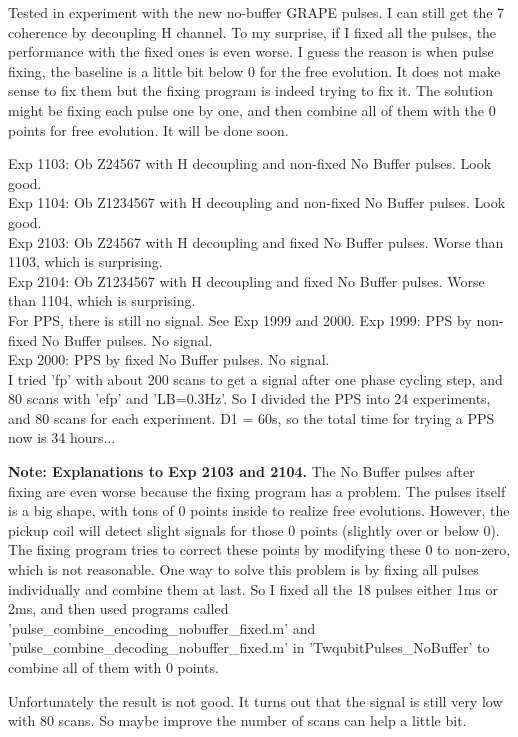 Tested in experiment with the new no-buffer GRAPE pulses. I can still get the 7 coherence by decoupling H channel. To my surprise, if I fixed all the pulses, the performance with the fixed ones is even worse. I guess the reason is when pulse fixing, the baseline is a little bit below 0 for the free evolution. It does not make sense to fix them but the fixing program is indeed trying to fix it. The solution might be fixing each pulse one by one, and then combine all of them with the 0 points for free evolution. It will be done soon.

Exp 1103: Ob Z24567 with H decoupling and non-fixed No Buffer pulses. Look good. \\
Exp 1104: Ob Z1234567 with H decoupling and non-fixed No Buffer pulses. Look good. \\
Exp 2103: Ob Z24567 with H decoupling and fixed No Buffer pulses. Worse than 1103, which is surprising. \\
Exp 2104: Ob Z1234567 with H decoupling and fixed No Buffer pulses. Worse than 1104, which is surprising. \\

For PPS, there is still no signal. See Exp 1999 and 2000.
Exp 1999: PPS by non-fixed No Buffer pulses. No signal. \\
Exp 2000: PPS by fixed No Buffer pulses. No signal. \\

I tried 'fp' with about 200 scans to get a signal after one phase cycling step, and 80 scans with 'efp' and 'LB=0.3Hz'. So I divided the PPS into 24 experiments, and 80 scans for each experiment. D1 = 60s, so the total time for trying a PPS now is 34 hours...

\textbf{Note: Explanations to Exp 2103 and 2104.} The No Buffer pulses after fixing are even worse because the fixing program has a problem. The pulses itself is a big shape, with tons of 0 points inside to realize free evolutions. However, the pickup coil will detect slight signals for those 0 points (slightly over or below 0). The fixing program tries to correct these points by modifying these 0 to non-zero, which is not reasonable. One way to solve this problem is by fixing all pulses individually and combine them at last. So I fixed all the 18 pulses either 1ms or 2ms, and then used programs called 'pulse\_combine\_encoding\_nobuffer\_fixed.m' and 'pulse\_combine\_decoding\_nobuffer\_fixed.m' in '\dir Twqubit\dir Pulses\_NoBuffer\dir' to combine all of them with 0 points.

Unfortunately the result is not good. It turns out that the signal is still very low with 80 scans. So maybe improve the number of scans can help a little bit.

